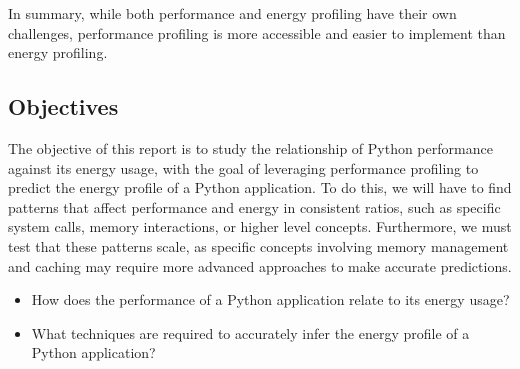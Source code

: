 In summary, while both performance and energy profiling have their own challenges, performance profiling is more
accessible and easier to implement than energy profiling.

\subsection{Objectives}\label{subsec:objectives}
The objective of this report is to study the relationship of Python performance against its energy usage, with the goal
of leveraging performance profiling to predict the energy profile of a Python application.
To do this, we will have to find patterns that affect performance and energy in consistent ratios, such as specific
system calls, memory interactions, or higher level concepts.
Furthermore, we must test that these patterns scale, as specific concepts involving memory management and caching may
require more advanced approaches to make accurate predictions.

\begin{itemize}
 \item How does the performance of a Python application relate to its energy usage?
 \item What techniques are required to accurately infer the energy profile of a Python application?
\end{itemize}

